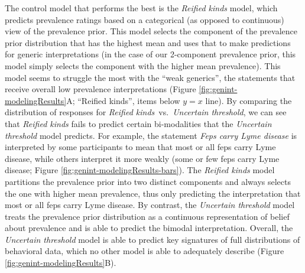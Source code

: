 \documentclass[floatsintext,doc]{apa6}
\begin{document}
The control model that performs the best is the \emph{Reified kinds} model, which predicts prevalence ratings based on a categorical (as opposed to continuous) view of the prevalence prior. This model selects the component of the prevalence prior distribution that has the highest mean and uses that to make predictions for generic interpretations (in the case of our 2-component prevalence prior, this model simply selects the component with the higher mean prevalence). 
This model seems to struggle the most with the ``weak generics'', the statements that receive overall low prevalence interpretations (Figure \ref{fig:genint-modelingResults}A; ``Reified kinds'', items below $y = x$ line).
By comparing the distribution of responses for \emph{Reified kinds}~vs.~\emph{Uncertain threshold}, we can see that  \emph{Reified kinds} fails to predict certain bi-modalities that the \emph{Uncertain threshold} model predicts.
For example, the statement \emph{Feps carry Lyme disease} is interpreted by some participants to mean that most or all feps carry Lyme disease, while others interpret it more weakly (some or few feps carry Lyme disease; Figure \ref{fig:genint-modelingResults-bars}). 
The \emph{Reified kinds} model partitions the prevalence prior into two distinct components and always selects the one with higher mean prevalence, thus only predicting the interpretation that most or all feps carry Lyme disease. 
By contrast, the \emph{Uncertain threshold} model treats the prevalence prior distribution as a continuous representation of belief about prevalence and is able to predict the bimodal interpretation. 
Overall, the \emph{Uncertain threshold} model is able to predict key signatures of full distributions of behavioral data, which no other model is able to adequately describe (Figure \ref{fig:genint-modelingResults}B).


\end{document}
